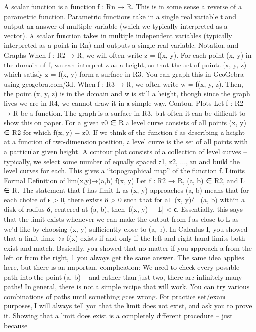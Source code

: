 A scalar function is a function f : Rn → R. This is in some sense a reverse of a parametric function.
Parametric functions take in a single real variable t and output an answer of multiple variable (which
we typically interpreted as a vector). A scalar function takes in multiple independent variables (typically
interpreted as a point in Rn) and outputs a single real variable.
Notation and Graphs
When f : R2 → R, we will often write z = f(x, y). For each point (x, y) in the domain of f, we can interpret
z as a height, so that the set of points (x, y, z) which satisfy z = f(x, y) form a surface in R3. You can graph
this in GeoGebra using geogebra.com/3d.
When f : R3 → R, we often write w = f(x, y, z). Then, the point (x, y, z) is in the domain and w is still a
height, though since the graph lives we are in R4, we cannot draw it in a simple way.
Contour Plots
Let f : R2 → R be a function. The graph is a surface in R3, but often it can be difficult to show this on
paper. For a given z0 ∈ R a level curve consists of all points (x, y) ∈ R2 for which f(x, y) = z0. If we think
of the function f as describing a height at a function of two-dimension position, a level curve is the set of
all points with a particular given height.
A contour plot consists of a collection of level curves – typically, we select some number of equally spaced
{z1, z2, ..., zn} and build the level curves for each. This gives a “topographical map” of the function f.
Limits
Formal Definition of lim(x,y)→(a,b) f(x, y)
Let f : R2 → R, (a, b) ∈ R2, and L ∈ R. The statement that f has limit L as (x, y) approaches (a, b) means
that for each choice of ϵ > 0, there exists δ > 0 such that for all (x, y) ̸= (a, b) within a disk of radius δ,
centered at (a, b), then
|f(x, y) − L| < ϵ.
Essentially, this says that the limit exists whenever we can make the output from f as close to L as we’d
like by choosing (x, y) sufficiently close to (a, b).
In Calculus I, you showed that a limit limx→a f(x) exists if and only if the left and right hand limits both
exist and match. Basically, you showed that no matter if you approach a from the left or from the right,
1
you always get the same answer. The same idea applies here, but there is an important complication: We
need to check every possible path into the point (a, b) – and rather than just two, there are infinitely many
paths!
In general, there is not a simple recipe that will work. You can try various combinations of paths until
something goes wrong. For practice set/exam purposes, I will always tell you that the limit does not exist,
and ask you to prove it. Showing that a limit does exist is a completely different procedure – just because
